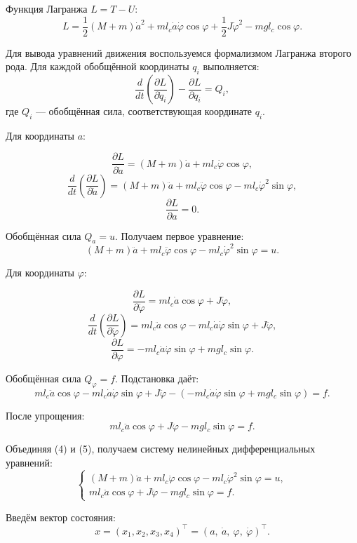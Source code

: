 \documentclass[a4paper,12pt]{article}
\begin{document}
Функция Лагранжа \(L = T - U\):
\[
L = 
\frac{1}{2}(M+m)\dot{a}^2 + m l_c\dot{a}\dot{\varphi}\cos\varphi + 
\frac{1}{2}J\dot{\varphi}^2 - m g l_c\cos\varphi. \tag{3}
\]

Для вывода уравнений движения воспользуемся формализмом Лагранжа второго рода. Для каждой обобщённой координаты \(q_i\) выполняется:
\[
\frac{d}{dt}\left(\frac{\partial L}{\partial \dot{q}_i}\right) - 
\frac{\partial L}{\partial q_i} = Q_i,
\]
где \(Q_i\) — обобщённая сила, соответствующая координате \(q_i\).

\medskip
\noindent Для координаты \(a\):

\[
\frac{\partial L}{\partial \dot{a}} = (M+m)\dot{a} + m l_c \dot{\varphi}\cos\varphi,
\]
\[
\frac{d}{dt}\left(\frac{\partial L}{\partial \dot{a}}\right) = 
(M+m)\ddot{a} + m l_c \ddot{\varphi}\cos\varphi - m l_c \dot{\varphi}^2\sin\varphi,
\]
\[
\frac{\partial L}{\partial a} = 0.
\]

Обобщённая сила \(Q_a = u\). Получаем первое уравнение:
\[
(M+m)\ddot{a} + m l_c \ddot{\varphi}\cos\varphi - m l_c \dot{\varphi}^2\sin\varphi = u. \tag{4}
\]

\medskip
\noindent Для координаты \(\varphi\):

\[
\frac{\partial L}{\partial \dot{\varphi}} = m l_c \dot{a}\cos\varphi + J\dot{\varphi},
\]
\[
\frac{d}{dt}\left(\frac{\partial L}{\partial \dot{\varphi}}\right) = 
m l_c \ddot{a}\cos\varphi - m l_c \dot{a}\dot{\varphi}\sin\varphi + J\ddot{\varphi},
\]
\[
\frac{\partial L}{\partial \varphi} = -m l_c \dot{a}\dot{\varphi}\sin\varphi + m g l_c \sin\varphi.
\]

Обобщённая сила \(Q_\varphi = f\). Подстановка даёт:
\[
m l_c \ddot{a}\cos\varphi - m l_c \dot{a}\dot{\varphi}\sin\varphi + J\ddot{\varphi} - 
(-m l_c \dot{a}\dot{\varphi}\sin\varphi + m g l_c \sin\varphi) = f.
\]

После упрощения:
\[
m l_c \ddot{a}\cos\varphi + J\ddot{\varphi} - m g l_c \sin\varphi = f. \tag{5}
\]

Объединяя (4) и (5), получаем систему нелинейных дифференциальных уравнений:
\[
\begin{cases}
	(M+m)\ddot{a} + m l_c \ddot{\varphi}\cos\varphi - m l_c \dot{\varphi}^2\sin\varphi = u, \\[6pt]
	m l_c \ddot{a}\cos\varphi + J\ddot{\varphi} - m g l_c \sin\varphi = f.
\end{cases} \tag{6}
\]

Введём вектор состояния:
\[
x = (x_1, x_2, x_3, x_4)^\top = (a,\ \dot{a},\ \varphi,\ \dot{\varphi})^\top.
\]
\end{document}
